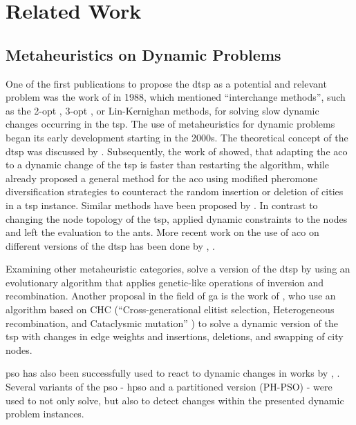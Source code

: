 
\chapter{Related Work}
\label{chap:related}

\section{Metaheuristics on Dynamic Problems}

One of the first publications to propose the \gls{dtsp} as a potential and relevant problem was the work of \citet{psaraftis1988dynamic} in 1988, which mentioned \enquote{interchange methods}, such as the 2-opt \cite{croes1958method}, 3-opt \cite{lin1965computer}, or Lin-Kernighan \cite{lin1973effective} methods, for solving slow dynamic changes occurring in the \gls{tsp}.
The use of metaheuristics for dynamic problems began its early development starting in the 2000s. The theoretical concept of the \gls{dtsp} was discussed by \citet{huang2001dynamic}. Subsequently, the work of \citet{angus2002ant} showed, that adapting the \gls{aco} to a dynamic change of the \gls{tsp} is faster than restarting the algorithm, while \citet{guntsch2001pheromone} already proposed a general method for the \gls{aco} using modified pheromone diversification strategies to counteract the random insertion or deletion of cities in a \gls{tsp} instance. Similar methods have been proposed by \citet{eyckelhof2002ant}.
In contrast to changing the node topology of the \gls{tsp}, \citet{silva2004ant} applied dynamic constraints to the nodes and left the evaluation to the ants.
More recent work on the use of \gls{aco} on different versions of the \gls{dtsp} has been done by \citet{mavrovouniotis2013ant}, \cite{mavrovouniotis2016ant}.
 
Examining other metaheuristic categories, \citet{li2006new} solve a version of the \gls{dtsp} by using an evolutionary algorithm that applies genetic-like operations of inversion and recombination. Another proposal in the field of \gls{ga} is the work of \citet{simoes2011chc}, who use an algorithm based on CHC  (\enquote{Cross-generational elitist selection, Heterogeneous recombination, and Cataclysmic mutation} \cite{eshelman1991chc}) to solve a dynamic version of the \gls{tsp} with changes in edge weights and insertions, deletions, and swapping of city nodes.

\gls{pso} has also been successfully used to react to dynamic changes in works by \citet{janson2004hierarchical},  \cite{janson2006hierarchical}. Several variants of the \gls{pso} - \gls{hpso} and a partitioned version (PH-PSO) - were used to not only solve, but also to detect changes within the presented dynamic problem instances.

